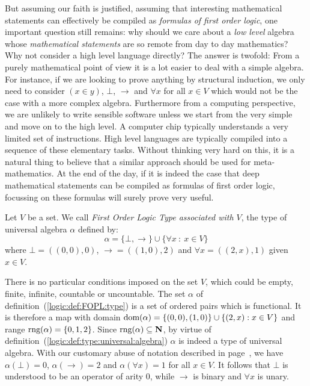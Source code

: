 But assuming our faith is justified, assuming that interesting
mathematical statements can effectively be compiled as {\em formulas
of first order logic}, one important question still remains: why
should we care about a {\em low level} algebra whose {\em
mathematical statements} are so remote from day to day mathematics?
Why not consider a high level language directly? The answer is
twofold: From a purely mathematical point of view it is a lot easier
to deal with a simple algebra. For instance, if we are looking to
prove anything by structural induction, we only need to consider
$(x\in y)$, $\bot$, $\to$ and $\forall x$ for all $x\in V$ which
would not be the case with a more complex algebra. Furthermore from
a computing perspective, we are unlikely to write sensible software
unless we start from the very simple and move on to the high level.
A computer chip typically understands a very limited set of
instructions. High level languages are typically compiled into a
sequence of these elementary tasks. Without thinking very hard on
this, it is a natural thing to believe that a similar approach
should be used for meta-mathematics. At the end of the day, if it is
indeed the case that deep mathematical statements can be compiled as
formulas of first order logic, focussing on these formulas will
surely prove very useful.

\begin{defin}\label{logic:def:FOPL:type}
Let $V$ be a set. We call {\em First Order Logic Type associated
with $V$}, the type of universal algebra $\alpha$ defined by:
    \[
    \alpha=\{\bot, \to\}\cup\{\forall x\ :\ x\in V\}
    \]
where $\bot=((0,0),0)$, $\to = ((1,0),2)$ and $\forall x=((2,x),1)$ given $x\in V$.
\end{defin}

There is no particular conditions imposed on the set $V$, which
could be empty, finite, infinite, countable or uncountable. The set
$\alpha$ of definition~(\ref{logic:def:FOPL:type}) is a set of
ordered pairs which is functional. It is therefore a map with domain
$\mbox{\rm dom}(\alpha)=\{(0,0),(1,0)\}\cup\{(2,x):x\in V\}$ and range
$\mbox{\rm rng}(\alpha)=\{0,1,2\}$. Since $\mbox{\rm rng}(\alpha)\subseteq\mbox{$\bf N$}$, by virtue
of definition~(\ref{logic:def:type:universal:algebra}) $\alpha$ is
indeed a type of universal algebra. With our customary abuse of
notation described in
page~\pageref{logic:def:type:universal:algebra}, we have
$\alpha(\bot)=0$, $\alpha(\to)=2$ and $\alpha(\forall x)=1$ for all
$x\in V$. It follows that $\bot$ is understood to be an operator of
arity $0$, while $\to$ is binary and $\forall x$ is unary.

